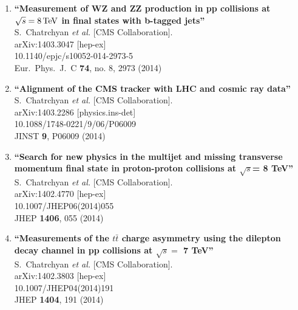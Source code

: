 \documentclass{article}
\begin{document}
\begin{enumerate}
\item%
{\bf ``Measurement of WZ and ZZ production in pp collisions at $\sqrt{s} = 8\,\rm  {TeV} $ in final states with b-tagged jets''}
  \\{}S.~Chatrchyan {\it et al.}  [CMS Collaboration].
  \\{}arXiv:1403.3047 [hep-ex]
    \\{}10.1140/epjc/s10052-014-2973-5
\\{}Eur.\ Phys.\ J.\ C {\bf 74}, no. 8, 2973 (2014) %


\item%
{\bf ``Alignment of the CMS tracker with LHC and cosmic ray data''}
  \\{}S.~Chatrchyan {\it et al.}  [CMS Collaboration].
  \\{}arXiv:1403.2286 [physics.ins-det]
    \\{}10.1088/1748-0221/9/06/P06009
\\{}JINST {\bf 9}, P06009 (2014) %


\item%
{\bf ``Search for new physics in the multijet and missing transverse momentum final state in proton-proton collisions at $\sqrt{s}$= 8 TeV''}
  \\{}S.~Chatrchyan {\it et al.}  [CMS Collaboration].
  \\{}arXiv:1402.4770 [hep-ex]
    \\{}10.1007/JHEP06(2014)055
\\{}JHEP {\bf 1406}, 055 (2014) %


\item%
{\bf ``Measurements of the $t\bar{t}$ charge asymmetry using the dilepton decay channel in pp collisions at $\sqrt{s} =$ 7 TeV''}
  \\{}S.~Chatrchyan {\it et al.}  [CMS Collaboration].
  \\{}arXiv:1402.3803 [hep-ex]
    \\{}10.1007/JHEP04(2014)191
\\{}JHEP {\bf 1404}, 191 (2014) %



\end{enumerate}
\end{document}

